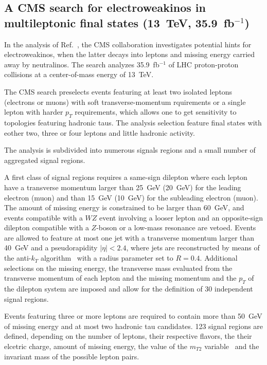 \documentclass[11pt]{cernrep}
\begin{document}
\subsection{A CMS search for electroweakinos in multileptonic final states
  (13~TeV, 35.9~fb$^{-1}$)}

In the analysis of Ref.~\cite{Sirunyan:2017lae}, the CMS collaboration
investigates potential hints for electroweakinos, when the latter decays into
leptons and missing energy carried away by neutralinos. The search analyzes
35.9~fb$^{-1}$ of LHC proton-proton collisions at a center-of-mass energy of
13~TeV.

The CMS search preselects events featuring at least two isolated leptons
(electrons or muons) with soft transverse-momentum rquirements or a single
lepton with harder $p_T$ requirements, which allows one to get sensitivity to
topologies featuring hadronic taus. The analysis selection feature final states
with eother two, three or four leptons and little hadronic activity.

The analysis is subdivided into numerous signals regions and a small number of
aggregated signal regions.

A first class of signal regions requires a same-sign
dilepton where each lepton have a transverse momentum larger than 25~GeV
(20~GeV) for the leading electron (muon) and than 15~GeV (10~GeV) for the
subleading electron (muon). The amount of missing energy is constrained to be
larger than 60~GeV, and events compatible with a $WZ$ event involving a looser
lepton and an opposite-sign dilepton compatible with a $Z$-boson or a low-mass
resonance are vetoed. Events are allowed to feature at most one jet with
a transverse momentum larger than 40~GeV and a pseudorapidity $|\eta|<2.4$,
where jets are reconstructed by means of the anti-$k_T$
algorithm~\cite{Cacciari:2008gp} with a radius parameter set to $R=0.4$.
Additional selections on the missing energy, the transverse mass evaluated from
the transverse momentum of each lepton and the missing momentum and the $p_T$ of
the dilepton system are imposed and allow for the definition of 30 independent
signal regions.

Events featuring three or more leptons are required to contain more than 50~GeV
of missing energy and at most two hadronic tau candidates. 123 signal regions
are defined, depending on the number of leptons, their respective flavors, the
their elcetric charge, amount of missing energy, the value of the $m_{T2}$
variable~\cite{Lester:1999tx} and the invariant mass of the possible lepton
pairs.
\end{document}
